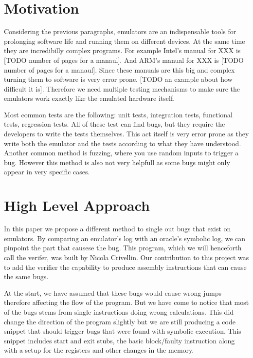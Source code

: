 \section{Motivation}
Considering the previous paragraphs, emulators are an indispensable tools for prolonging software life and running them on different devices.
At the same time they are incredibilly complex programs.
For example Intel's manual for XXX is [TODO number of pages for a manaul].
And ARM's manual for XXX is [TODO number of pages for a manaul].
Since these manuals are this big and complex turning them to software is very error prone.
[TODO an example about how difficult it is].
Therefore we need multiple testing mechanisms to make sure the emulators work exactly like the emulated hardware itself.

Most common tests are the following: unit tests, integration tests, functional tests, regression tests.
All of these test can find bugs, but they require the developers to write the tests themselves.
This act itself is very error prone as they write both the emulator and the tests according to what they have understood.
Another common method is fuzzing, where you use random inputs to trigger a bug.
However this method is also not very helpfull as some bugs might only appear in very specific cases.

\section{High Level Approach}
In this paper we propose a different method to single out bugs that exist on emulators.
By comparing an emulator's log with an oracle's symbolic log, we can pinpoint the part that causese the bug.
This program, which we will henceforth call the verifer, was built by Nicola Crivellin.
Our contribution to this project was to add the verifier the capability to produce assembly instructions that can cause the same bugs.

At the start, we have assumed that these bugs would cause wrong jumps therefore affecting the flow of the program.
But we have come to notice that most of the bugs stems from single instructions doing wrong calculations.
This did change the direction of the program slightly but we are still producing a code snippet that should trigger bugs that were found with symbolic execution.
This snippet includes start and exit stubs, the basic block/faulty instruction along with a setup for the registers and other changes in the memory.

